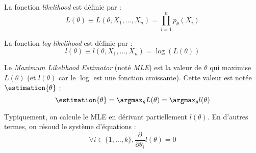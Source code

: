        \begin{definition}
            La fonction \textit{likelihood} est définie par :
            \[
                L(\theta) \equiv L(\theta, X_1, \dots, X_n) = \prod_{i=1}^n p_\theta(X_i)
            \]

            La fonction \textit{log-likelihood} est définie par :
            \[
                l(\theta) \equiv l(\theta, X_1, \dots, X_n) = \log(L(\theta))
            \]

            Le \textit{Maximum Likelihood Estimator} (noté \textit{MLE}) est la valeur de \(\theta\) qui maximise \(L(\theta)\) (et \(l(\theta)\) car le \(\log\) est une fonction croissante). Cette valeur est notée \(\estimation{\theta}\) :
            \[
                \estimation{\theta} = \argmax_\theta L(\theta) = \argmax_\theta l(\theta)
            \]
        \end{definition}

        Typiquement, on calcule le MLE en dérivant partiellement \(l(\theta)\). En d'autres termes, on résoud le système d'équations :
        \[
            \forall i \in \{1, \dots, k\}, \frac{\partial}{\partial \theta_i} l(\theta) = 0
        \]